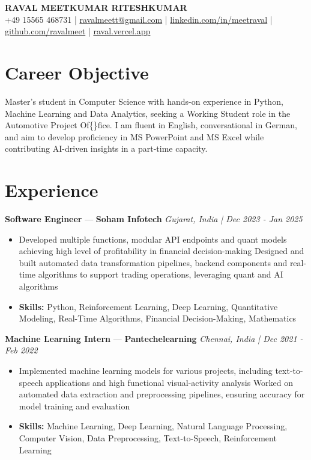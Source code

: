 \documentclass[a4paper,10pt]{article}
\begin{document}
\begin{center}
  {\Large\bfseries RAVAL MEETKUMAR RITESHKUMAR}\\[2pt]
  {\small +49 15565 468731 \;|\; \href{mailto:ravalmeett@gmail.com}{ravalmeett@gmail.com} \;|\; \href{https://www.linkedin.com/in/meetraval/}{linkedin.com/in/meetraval} \;|\; \href{https://github.com/ravalmeet}{github.com/ravalmeet} \;|\; \href{https://raval.vercel.app/}{raval.vercel.app}}
\end{center}
\vspace{-3pt}

\section*{Career Objective}
Master's student in Computer Science with hands-on experience in Python, Machine Learning and Data Analytics, seeking a Working Student role in the Automotive Project Of\{\}fice. I am fluent in English, conversational in German, and aim to develop proficiency in MS PowerPoint and MS Excel while contributing AI-driven insights in a part-time capacity.\par

\section*{Experience}
\textbf{Software Engineer} — \textbf{Soham Infotech} \hfill \textit{Gujarat, India \;|\; Dec 2023 - Jan 2025}\par
\vspace{1pt}
\begin{itemize}
  \item Developed multiple functions, modular API endpoints and quant models achieving high level of profitability in financial decision-making Designed and built automated data transformation pipelines, backend components and real-time algorithms to support trading operations, leveraging quant and AI algorithms
  \item \textbf{Skills:} Python, Reinforcement Learning, Deep Learning, Quantitative Modeling, Real-Time Algorithms, Financial Decision-Making, Mathematics
\end{itemize}
\vspace{3pt}
\textbf{Machine Learning Intern} — \textbf{Pantechelearning} \hfill \textit{Chennai, India \;|\; Dec 2021 - Feb 2022}\par
\vspace{1pt}
\begin{itemize}
  \item Implemented machine learning models for various projects, including text-to-speech applications and high functional visual-activity analysis Worked on automated data extraction and preprocessing pipelines, ensuring accuracy for model training and evaluation
  \item \textbf{Skills:} Machine Learning, Deep Learning, Natural Language Processing, Computer Vision, Data Preprocessing, Text-to-Speech, Reinforcement Learning
\end{itemize}
\end{document}
